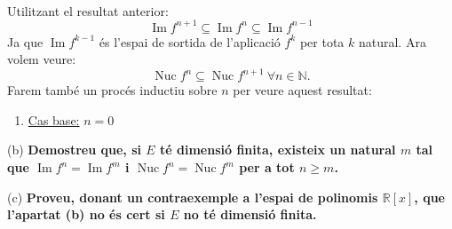 \documentclass[11pt]{article}
\DeclareMathOperator{\nuc}{Nuc}
\DeclareMathOperator{\img}{Im}
\begin{document}
\begin{legal}
\begin{enumerate}
$$\begin{array}{lll}
		\end{array}
$$
		Utilitzant el resultat anterior:
		$$
		\img{f^{n+1}}\subseteq\img{f^n}\subseteq\img{f^{n-1}}
		$$
		Ja que $\img{f^{k-1}}$ és l'espai de sortida de l'aplicació $f^k$ per tota $k$ natural. Ara volem veure:
		\begin{equation}
		\nuc{f^n}\subseteq\nuc{f^{n+1}}\ \forall n\in\mathbb{N}.
		\end{equation}
		Farem també un procés inductiu sobre $n$ per veure aquest resultat:
		\begin{enumerate}
		\item \underline{Cas base:} $n=0$
		\end{enumerate}
	\end{enumerate}
	\item[(b) ]\textbf{Demostreu que, si $E$ té dimensió finita, existeix un natural $m$ tal que $\img{f^n}=\img{f^m}$ i $\nuc{f^n}=\nuc{f^m}$ per a tot $n\geq m$.}\\
	\item[(c) ]\textbf{Proveu, donant un contraexemple a l’espai de polinomis $\mathbb{R}[x]$, que l’apartat (b) no és cert si $E$ no té dimensió finita.}\\
\end{legal}
\end{document}
